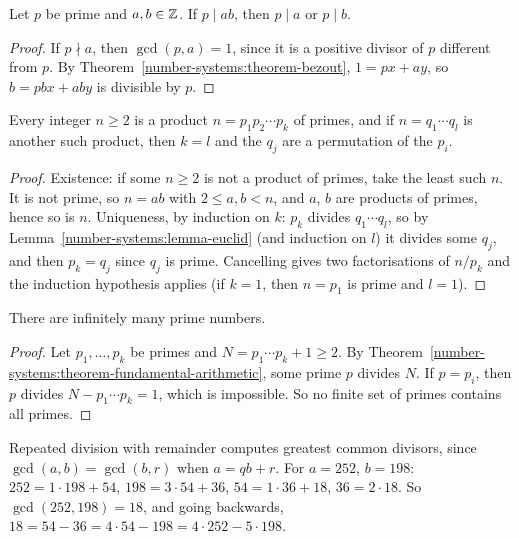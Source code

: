 \begin{lemma}[Euclid]\label{number-systems:lemma-euclid}
Let $p$ be prime and $a, b \in \mathbb{Z}$. If $p \mid ab$, then $p \mid a$ or $p \mid b$.
\end{lemma}

\begin{proof}
If $p \nmid a$, then $\gcd(p, a) = 1$, since it is a positive divisor of $p$
different from $p$. By Theorem~\ref{number-systems:theorem-bezout},
$1 = px + ay$, so $b = pbx + aby$ is divisible by $p$.
\end{proof}

\begin{theorem}\label{number-systems:theorem-fundamental-arithmetic}
Every integer $n \geq 2$ is a product $n = p_1 p_2 \cdots p_k$ of primes, and if
$n = q_1 \cdots q_l$ is another such product, then $k = l$ and the $q_j$ are a
permutation of the $p_i$.
\end{theorem}

\begin{proof}
Existence: if some $n \geq 2$ is not a product of primes, take the least such
$n$. It is not prime, so $n = ab$ with $2 \leq a, b < n$, and $a$, $b$ are products
of primes, hence so is $n$. Uniqueness, by induction on $k$: $p_k$ divides
$q_1 \cdots q_l$, so by Lemma~\ref{number-systems:lemma-euclid} (and induction on
$l$) it divides some $q_j$, and then $p_k = q_j$ since $q_j$ is prime. Cancelling
gives two factorisations of $n/p_k$ and the induction hypothesis applies (if
$k = 1$, then $n = p_1$ is prime and $l = 1$).
\end{proof}

\begin{theorem}[Euclid]\label{number-systems:theorem-infinitely-many-primes}
There are infinitely many prime numbers.
\end{theorem}

\begin{proof}
Let $p_1, \ldots, p_k$ be primes and $N = p_1 \cdots p_k + 1 \geq 2$. By
Theorem~\ref{number-systems:theorem-fundamental-arithmetic}, some prime $p$
divides $N$. If $p = p_i$, then $p$ divides $N - p_1 \cdots p_k = 1$, which is
impossible. So no finite set of primes contains all primes.
\end{proof}

\begin{example}\label{number-systems:example-euclidean-algorithm}
Repeated division with remainder computes greatest common divisors, since
$\gcd(a, b) = \gcd(b, r)$ when $a = qb + r$. For $a = 252$, $b = 198$:
$252 = 1 \cdot 198 + 54$, $198 = 3 \cdot 54 + 36$, $54 = 1 \cdot 36 + 18$,
$36 = 2 \cdot 18$. So $\gcd(252, 198) = 18$, and going backwards,
$18 = 54 - 36 = 4 \cdot 54 - 198 = 4 \cdot 252 - 5 \cdot 198$.
\end{example}

